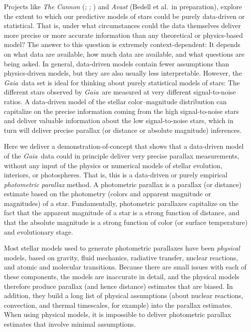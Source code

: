 \documentclass[modern]{aastex61}
\newcommand{\project}[1]{\textsl{#1}}
\newcommand{\gaia}{\project{Gaia}}
\begin{document}
Projects like \project{The Cannon} (\citealt{ness15}; \citealt{casey17}; \citealt{ho17})
and \project{Avast} (Bedell et al.\ in preparation),
explore the extent to which our predictive models of
stars could be purely data-driven or statistical.
That is, under what circumstances could the data themselves deliver
more precise or more accurate information than any theoretical or
physics-based model?
The answer to this question is extremely context-dependent: It depends
on what data are available, how much data are available, and what
questions are being asked.
In general, data-driven models contain fewer assumptions than
physics-driven models, but they are also usually less interpretable.
However, the \gaia\ data set is ideal for thinking about purely statistical
models of stars:
The different stars observed by \gaia\ are measured at very different
signal-to-noise ratios.
A data-driven model of the stellar color--magnitude distribution can capitalize
on the precise information coming from the high signal-to-noise stars
and deliver valuable information about the low signal-to-noise stars,
which in turn will deliver precise parallax (or distance or absolute magnitude) inferences.

Here we deliver a demonstration-of-concept that shows that a
data-driven model of the \gaia\ data could in principle deliver very
precise parallax measurements, without any input of the physics or numerical models of stellar
evolution, interiors, or photospheres.
That is, this is a data-driven or purely empirical \emph{photometric
  parallax} method.
A photometric parallax is a parallax (or distance) estimate based on
the photometry (colors and apparent magnitude or magnitudes) of a
star.
Fundamentally, photometric parallaxes capitalize on the fact that the
apparent magnitude of a star is a strong function of distance, and
that the absolute magnitude is a strong function of color (or surface
temperature) and evolutionary stage.

Most stellar models used to generate photometric
parallaxes have been \emph{physical} models, based on gravity, fluid mechanics,
radiative transfer, nuclear reactions, and atomic and molecular transitions.
Because there are small issues with each of these components, the models are inaccurate in detail, and
the physical models therefore produce parallax (and hence distance) estimates that are biased.
In addition, they build a long list of physical assumptions (about
nuclear reactions, convection, and thermal timescales, for example)
into the parallax estimates.
When using physical models, it is impossible to deliver photometric parallax estimates that involve minimal assumptions.
\end{document}
